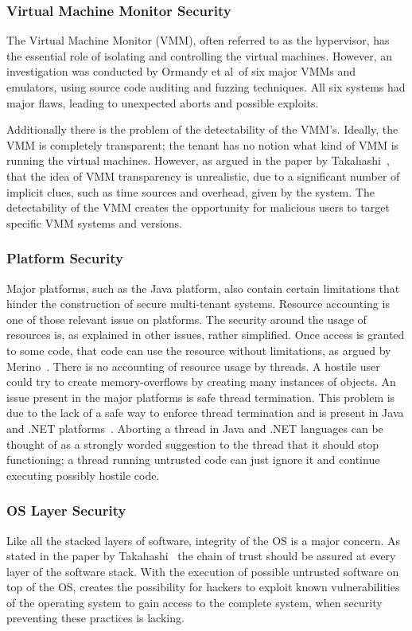 \subsubsection{Virtual Machine Monitor Security}
The Virtual Machine Monitor (VMM), often referred to as the hypervisor, has the essential role of isolating and controlling the virtual machines. 
However, an investigation was conducted by Ormandy et al~\cite{Ormandy2007Security}of six major VMMs and emulators, using source code auditing and fuzzing techniques. All six systems had major flaws, leading to unexpected aborts and possible exploits.

Additionally there is the problem of the detectability of the VMM’s. Ideally, the VMM is completely transparent; the tenant has no notion what kind of VMM is running the virtual machines. 
However, as argued in the paper by Takahashi~\cite{Takahashi2012Security}, that the idea of VMM transparency is unrealistic, due to a significant number of implicit clues, such as time sources and overhead, given by the system. 
The detectability of the VMM creates the opportunity for malicious users to target specific VMM systems and versions.

\subsubsection{Platform Security}
Major platforms, such as the Java platform, also contain certain limitations that hinder the construction of secure multi-tenant systems. 
Resource accounting is one of those relevant issue on platforms. 
The security around the usage of resources is, as explained in other issues, rather simplified. 
Once access is granted to some code, that code can use the resource without limitations, as argued by Merino~\cite{Merino2011Security}. 
There is no accounting of resource usage by threads. 
A hostile user could try to create memory-overflows by creating many instances of objects.
An issue present in the major platforms is safe thread termination. 
This problem is due to the lack of a safe way to enforce thread termination and is present in Java and .NET platforms~\cite{Merino2011Security}. 
Aborting a thread in Java and .NET languages can be thought of as a strongly worded suggestion to the thread that it should stop functioning; a thread running untrusted code can just ignore it and continue executing possibly hostile code.

\subsubsection{OS Layer Security}
Like all the stacked layers of software, integrity of the OS is a major concern. 
As stated in the paper by Takahashi~\cite{Takahashi2012Security} the chain of trust should be assured at every layer of the software stack.
With the execution of possible untrusted software on top of the OS, creates the possibility for hackers to exploit known vulnerabilities of the operating system to gain access to the complete system, when security preventing these practices is lacking.

